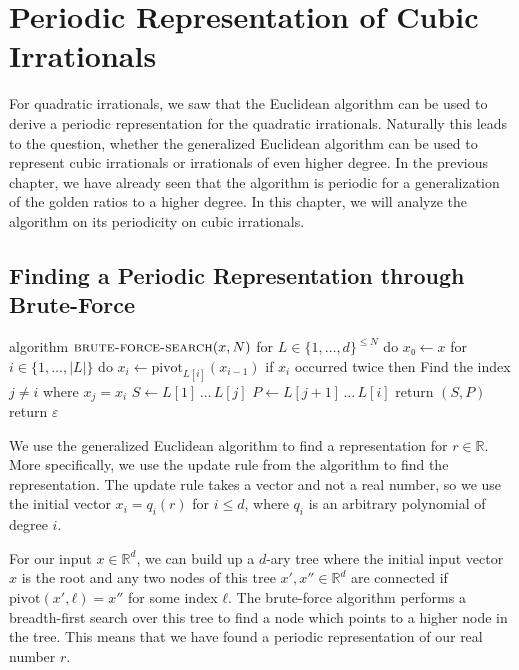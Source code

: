 \chapter{Periodic Representation of Cubic Irrationals}

For quadratic irrationals, we saw that the Euclidean algorithm can be used to
derive a periodic representation for the quadratic irrationals.
Naturally this leads to the question, whether the generalized Euclidean
algorithm can be used to represent cubic irrationals or irrationals of even
higher degree.
In the previous chapter, we have already seen that the algorithm is periodic
for a generalization of the golden ratios to a higher degree.
In this chapter, we will analyze the algorithm on its periodicity on cubic
irrationals.

\section{Finding a Periodic Representation through Brute-Force}

\begin{Pseudocode}
algorithm $\textsc{brute-force-search}(x, N)$
  for $L ∈ \{1, …, d\}^{≤ N}$ do
    $x₀ ← x$
    for $i ∈ \{1, …, |L|\}$ do
      $x_i ← \mathrm{pivot}_{L[i]}(x_{i-1})$
      if $x_i$ occurred twice then
        Find the index $j ≠ i$ where $x_j = x_i$
        $S ← L[1] \,…\, L[j]$
        $P ← L[j+1] \,…\, L[i]$
        return $(S, P)$
  return $ε$
\end{Pseudocode}

We use the generalized Euclidean algorithm to find a representation for $r ∈ ℝ$.
More specifically, we use the update rule from the algorithm to find the
representation.
The update rule takes a vector and not a real number, so we use the initial
vector $x_i = q_i(r)$ for $i ≤ d$, where $q_i$ is an arbitrary polynomial of
degree $i$.

For our input $x ∈ ℝ^d$, we can build up a $d$-ary tree where the initial input
vector $x$ is the root and any two nodes of this tree $x', x'' ∈ ℝ^d$ are
connected if $\mathrm{pivot}(x', ℓ) = x''$ for some index $ℓ$.
The brute-force algorithm performs a breadth-first search over this tree to
find a node which points to a higher node in the tree.
This means that we have found a periodic representation of our real number $r$.

